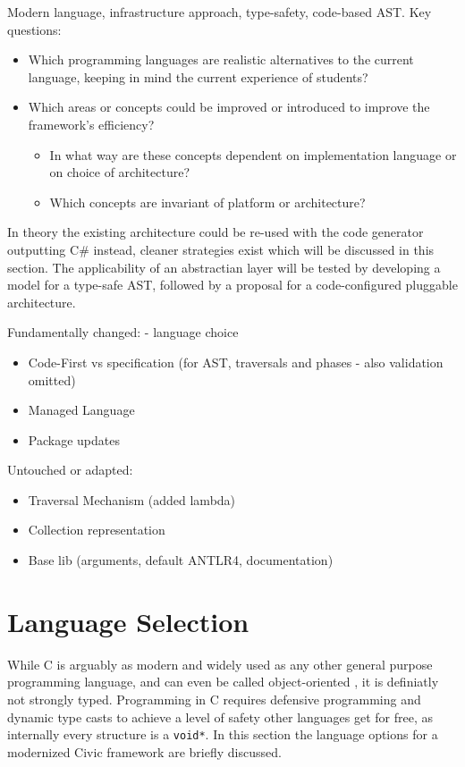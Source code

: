 \documentclass[twoside,openright]{uva-bachelor-thesis}
\newcommand{\code}[1]{\texttt{\footnotesize#1}}
\begin{document}
	Modern language, infrastructure approach, type-safety, code-based AST. Key questions:
	\begin{itemize}
		\item Which programming languages are realistic alternatives to the current language, keeping in mind the current experience of students?
		\item Which areas or concepts could be improved or introduced to improve the framework's efficiency?
		\begin{itemize}
			\item In what way are these concepts dependent on implementation language or on choice of architecture?
			\item Which concepts are invariant of platform or architecture?
		\end{itemize}
	\end{itemize}
	
	In theory the existing architecture could be re-used with the code generator outputting C\# instead, cleaner strategies exist which will be discussed in this section. The applicability of an abstractian layer will be tested by developing a model for a type-safe AST, followed by a proposal for a code-configured pluggable architecture.
		
		Fundamentally changed:
		- language choice
		\begin{itemize}
			\item Code-First vs specification (for AST, traversals and phases - also validation omitted)
			\item Managed Language
			\item Package updates
		\end{itemize}
		Untouched or adapted:
		\begin{itemize}
			\item Traversal Mechanism (added lambda)
			\item Collection representation
			\item Base lib (arguments, default ANTLR4, documentation)
		\end{itemize}
	
	\section{Language Selection}
		While C is arguably as modern and widely used as any other general purpose programming language, and can even be called object-oriented \cite{book:schreiner}, it is definiatly not strongly typed. Programming in C requires defensive programming and dynamic type casts to achieve a level of safety other languages get for free, as internally every structure is a \code{void*}. In this section the language options for a modernized Civic framework are briefly discussed.
		
\end{document}
